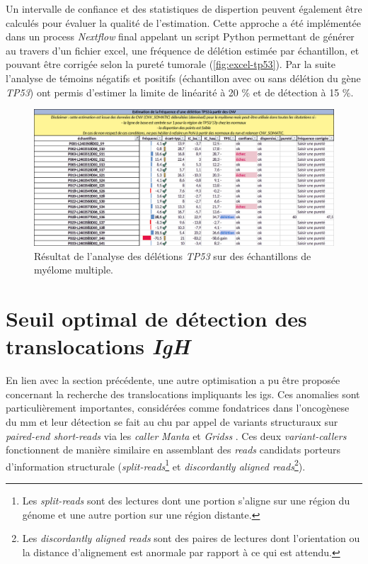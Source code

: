 Un intervalle de confiance et des statistiques de dispertion peuvent également être calculés pour évaluer la qualité de l'estimation. Cette 
approche a été implémentée dans un process \textit{Nextflow} final appelant un script Python permettant de générer au travers d'un fichier excel, 
une fréquence de délétion estimée par échantillon, et pouvant être corrigée selon la pureté tumorale (\autoref{fig:excel-tp53}). 
Par la suite l'analyse de témoins négatifs et positifs (échantillon avec ou sans délétion du gène \textit{TP53}) ont permis d'estimer 
la limite de linéarité à 20 \% et de détection à 15 \%.

\begin{figure}[H]
    \centering
    \includegraphics[width=1\textwidth]{images/excel_tp53.png}
    \caption{Résultat de l'analyse des délétions \textit{TP53} sur des échantillons de myélome multiple.}
    \label{fig:excel-tp53}
\end{figure}

\section{Seuil optimal de détection des translocations \textit{IgH}}

En lien avec la section précédente, une autre optimisation a pu être proposée concernant la recherche des translocations impliquants les \glspl{ig}.
Ces anomalies sont particulièrement importantes, considérées comme fondatrices dans l'oncogènese du \gls{mm} et leur détection se fait au \gls{chu} 
par appel de variants structuraux sur \textit{paired-end short-reads} via les \textit{caller} \textit{Manta} \cite{chenMantaRapidDetection2016a} et 
\textit{Gridss} \cite{cameronGRIDSSSensitiveSpecific2017a}. Ces deux \textit{variant-callers} fonctionnent de manière similaire en assemblant des \textit{reads} candidats
porteurs d'information structurale (\textit{split-reads}\footnote{Les \textit{split-reads} sont des lectures dont une portion s'aligne sur une région du génome 
et une autre portion sur une région distante.} et \textit{discordantly aligned reads}\footnote{Les \textit{discordantly aligned reads} 
sont des paires de lectures dont l'orientation ou la distance d'alignement est anormale par rapport à ce qui est attendu.}).


